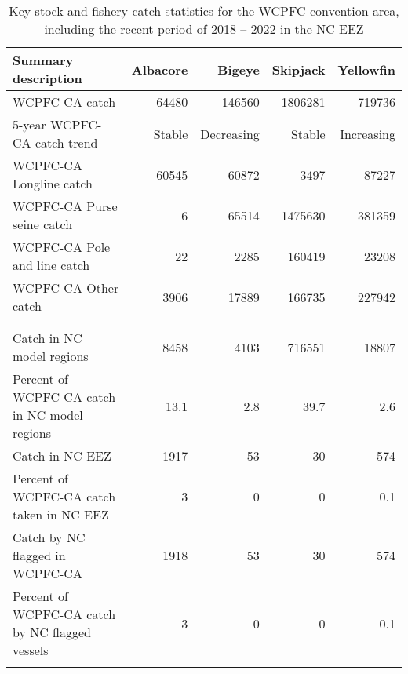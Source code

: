 \begin{longtable}{lrrrr}
\caption{Key stock and fishery catch statistics for the WCPFC convention area, including the recent period of 2018 -- 2022 in the NC EEZ} \\ 
  \hline
Summary description & Albacore & Bigeye & Skipjack & Yellowfin \\ 
  \hline
WCPFC-CA catch & 64480 & 146560 & 1806281 & 719736 \\ 
  5-year WCPFC-CA catch trend & Stable & Decreasing & Stable & Increasing \\ 
  WCPFC-CA Longline catch & 60545 & 60872 & 3497 & 87227 \\ 
  WCPFC-CA Purse seine catch & 6 & 65514 & 1475630 & 381359 \\ 
  WCPFC-CA Pole and line catch & 22 & 2285 & 160419 & 23208 \\ 
  WCPFC-CA Other catch & 3906 & 17889 & 166735 & 227942 \\ 
   &  &  &  &  \\ 
   \hline
 &  &  &  &  \\ 
  Catch in NC model regions & 8458 & 4103 & 716551 & 18807 \\ 
  Percent of WCPFC-CA catch in NC model regions & 13.1 & 2.8 & 39.7 & 2.6 \\ 
  Catch in NC EEZ & 1917 & 53 & 30 & 574 \\ 
  Percent of WCPFC-CA catch taken in NC EEZ & 3 & 0 & 0 & 0.1 \\ 
  Catch by NC flagged in WCPFC-CA & 1918 & 53 & 30 & 574 \\ 
  Percent of WCPFC-CA catch by NC flagged vessels & 3 & 0 & 0 & 0.1 \\ 
  \hline
\label{cat_sum_tab}
\end{longtable}
